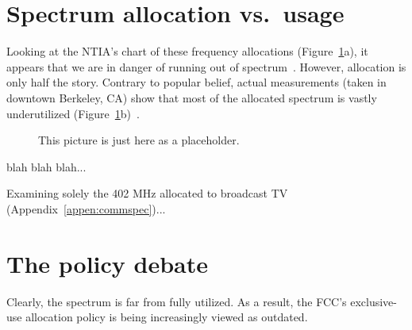 \section{Spectrum allocation vs.~usage}
\label{sec:usage}

Looking at the NTIA's chart of these frequency allocations
(Figure~\ref{fig:spectrum_alloc}a), it appears that we are in danger
of running out of spectrum~\cite{NTIAspectrum}. However, allocation
is only half the story. Contrary to popular belief, actual
measurements (taken in downtown Berkeley, CA) show that most of the
allocated spectrum is vastly underutilized
(Figure~\ref{fig:spectrum_alloc}b)~\cite{BWRC2004, NewAm2005}.

\begin{figure}[htp]
\begin{center}
\caption{\footnotesize{This picture is just here as a placeholder.
\label{fig:spectrum_alloc}}}
\end{center}
\end{figure}

blah blah blah...

Examining solely the 402 MHz allocated to broadcast TV
(Appendix~\ref{appen:commspec})...

\section{The policy debate}
\label{sec:policy}

Clearly, the spectrum is far from fully utilized. As a result, the
FCC's exclusive-use allocation policy is being increasingly viewed
as outdated.
